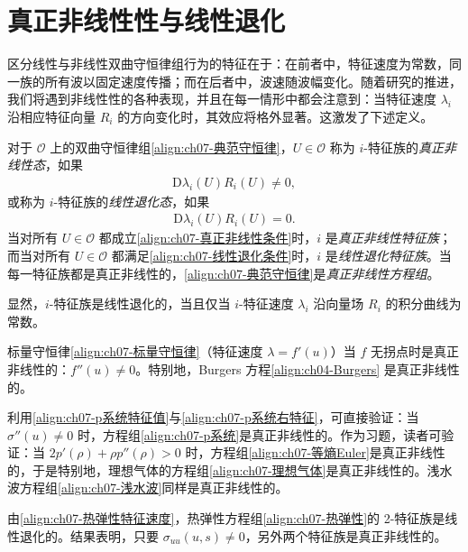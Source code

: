 \documentclass[../../main.tex]{subfiles}
\begin{document}
\section{真正非线性性与线性退化}\label{section:ch07-真正非线性}

区分线性与非线性双曲守恒律组行为的特征在于：在前者中，特征速度为常数，同一族的所有波以固定速度传播；而在后者中，波速随波幅变化。随着研究的推进，我们将遇到非线性性的各种表现，并且在每一情形中都会注意到：当特征速度 $\lambda_i$ 沿相应特征向量 $R_i$ 的方向变化时，其效应将格外显著。这激发了下述定义。

\begin{definition}[真正非线性性与线性退化]\label{definition:ch07-真正非线性}
对于 $\mathscr{O}$ 上的双曲守恒律组\eqref{align:ch07-典范守恒律}，$U\in\mathscr{O}$ 称为 $i$-特征族的\emph{真正非线性态}，如果
\begin{align}
\mathrm{D}\lambda_i(U)R_i(U)\neq 0,
\label{align:ch07-真正非线性条件}
\end{align}
或称为 $i$-特征族的\emph{线性退化态}，如果
\begin{align}
\mathrm{D}\lambda_i(U)R_i(U)=0.
\label{align:ch07-线性退化条件}
\end{align}
当对所有 $U\in\mathscr{O}$ 都成立\eqref{align:ch07-真正非线性条件}时，$i$ 是\emph{真正非线性特征族}；而当对所有 $U\in\mathscr{O}$ 都满足\eqref{align:ch07-线性退化条件}时，$i$ 是\emph{线性退化特征族}。当每一特征族都是真正非线性的，\eqref{align:ch07-典范守恒律}是\emph{真正非线性方程组}。
\end{definition}

显然，$i$-特征族是线性退化的，当且仅当 $i$-特征速度 $\lambda_i$ 沿向量场 $R_i$ 的积分曲线为常数。

标量守恒律\eqref{align:ch07-标量守恒律}（特征速度 $\lambda=f'(u)$）当 $f$ 无拐点时是真正非线性的：$f''(u)\neq 0$。特别地，Burgers 方程\eqref{align:ch04-Burgers}
是真正非线性的。

利用\eqref{align:ch07-p系统特征值}与\eqref{align:ch07-p系统右特征}，可直接验证：当 $\sigma''(u)\neq 0$ 时，方程组\eqref{align:ch07-p系统}是真正非线性的。作为习题，读者可验证：当 $2p'(\rho)+\rho p''(\rho)>0$ 时，方程组\eqref{align:ch07-等熵Euler}是真正非线性的，于是特别地，理想气体的方程组\eqref{align:ch07-理想气体}是真正非线性的。浅水波方程组\eqref{align:ch07-浅水波}同样是真正非线性的。

由\eqref{align:ch07-热弹性特征速度}，热弹性方程组\eqref{align:ch07-热弹性}的 2-特征族是线性退化的。结果表明，只要 $\sigma_{uu}(u,s)\neq 0$，另外两个特征族是真正非线性的。
\end{document}
